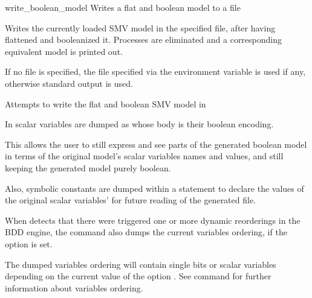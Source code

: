\begin{nusmvCommand} {write\_boolean\_model} {Writes a flat and boolean model to a file}


Writes the currently loaded SMV model in the specified file, after
having flattened and booleanized it. Processes are eliminated and a
corresponding equivalent model is printed out.

If no file is specified, the file specified via the environment
variable  is used if any, otherwise
standard output is used.

\begin{cmdOpt}
 {Attempts to write the flat
and boolean SMV model in }
\end{cmdOpt}

In \NuSMV scalar variables are dumped as  whose body
is their boolean encoding.
  
This allows the user to still express and see parts of the generated
boolean model in terms of the original model's scalar variables names
and values, and still keeping the generated model purely boolean.

Also, symbolic constants are dumped within a 
statement to declare the values of the original scalar variables' for
future reading of the generated file.

When \nusmv detects that there were triggered one or more dynamic
reorderings in the BDD engine, the command
 also dumps the current variables
ordering, if the option  is set.

The dumped variables ordering will contain single bits or scalar
variables depending on the current value of the option
. See command 
for further information about variables ordering.

\end{nusmvCommand}
